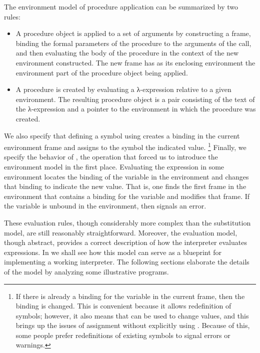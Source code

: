 The environment model of procedure application can be summarized by two rules:
\begin{itemize}

	\item
		A procedure object is applied to a set of arguments by constructing a frame, binding the formal parameters of the procedure to the arguments of the call, and then evaluating the body of the procedure in the context of the new environment constructed.
		The new frame has as its enclosing environment the environment part of the procedure object being applied.

	\item
		A procedure is created by evaluating a λ-expression relative to a given environment.
		The resulting procedure object is a pair consisting of the text of the λ-expression and a pointer to the environment in which the procedure was created.

\end{itemize}

We also specify that defining a symbol using  creates a binding in the current environment frame and assigns to the symbol the indicated value.%
\footnote{
	If there is already a binding for the variable in the current frame, then the binding is changed.
	This is convenient because it allows redefinition of symbols;
	however, it also means that  can be used to change values, and this brings up the issues of assignment without explicitly using .
	Because of this, some people prefer redefinitions of existing symbols to signal errors or warnings.
}
Finally, we specify the behavior of , the operation that forced us to introduce the environment model in the first place.
Evaluating the expression  in some environment locates the binding of the variable in the environment and changes that binding to indicate the new value.
That is, one finds the first frame in the environment that contains a binding for the variable and modifies that frame.
If the variable is unbound in the environment, then  signals an error.

These evaluation rules, though considerably more complex than the substitution model, are still reasonably straightforward.
Moreover, the evaluation model, though abstract, provides a correct description of how the interpreter evaluates expressions.
In  we shall see how this model can serve as a blueprint for implementing a working interpreter.
The following sections elaborate the details of the model by analyzing some illustrative programs.



